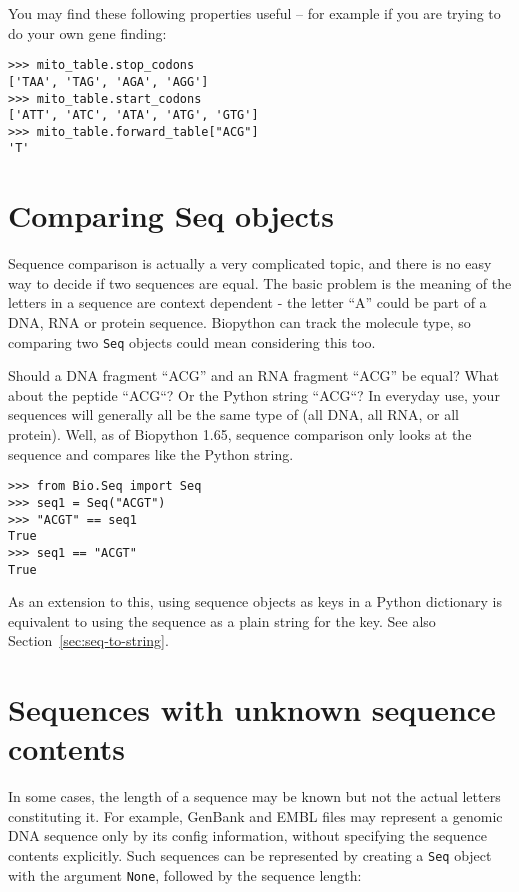 You may find these following properties useful -- for example if you are trying
to do your own gene finding:

\begin{verbatim}
>>> mito_table.stop_codons
['TAA', 'TAG', 'AGA', 'AGG']
>>> mito_table.start_codons
['ATT', 'ATC', 'ATA', 'ATG', 'GTG']
>>> mito_table.forward_table["ACG"]
'T'
\end{verbatim}

\section{Comparing Seq objects}
\label{sec:seq-comparison}

Sequence comparison is actually a very complicated topic, and there is no easy
way to decide if two sequences are equal. The basic problem is the meaning of
the letters in a sequence are context dependent - the letter ``A'' could be part
of a DNA, RNA or protein sequence. Biopython can track the molecule type, so
comparing two \verb|Seq| objects could mean considering this too.

Should a DNA fragment ``ACG'' and an RNA fragment ``ACG'' be equal? What about
the peptide ``ACG``? Or the Python string ``ACG``?
In everyday use, your sequences will generally all be the same type of
(all DNA, all RNA, or all protein).
Well, as of Biopython 1.65, sequence comparison only looks at the sequence
and compares like the Python string.

\begin{verbatim}
>>> from Bio.Seq import Seq
>>> seq1 = Seq("ACGT")
>>> "ACGT" == seq1
True
>>> seq1 == "ACGT"
True
\end{verbatim}

As an extension to this, using sequence objects as keys in a Python dictionary
is equivalent to using the sequence as a plain string for the key.
See also Section~\ref{sec:seq-to-string}.

\section{Sequences with unknown sequence contents}

In some cases, the length of a sequence may be known but not the actual letters constituting it. For example, GenBank and EMBL files may represent a genomic DNA sequence only by its config information, without specifying the sequence contents explicitly. Such sequences can be represented by creating a \verb|Seq| object with the argument \verb|None|, followed by the sequence length:

